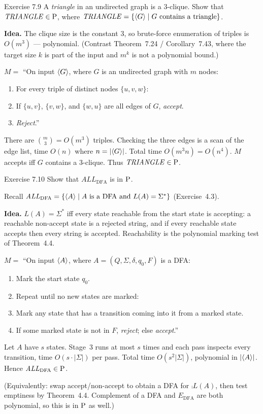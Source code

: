 \begin{question}{Exercise 7.9}
A \emph{triangle} in an undirected graph is a $3$-clique. Show that $\mathit{TRIANGLE}\in\mathrm{P}$, where $\mathit{TRIANGLE}=\{\langle G\rangle\mid \text{$G$ contains a triangle}\}$.
\end{question}
\begin{soln}
\textbf{Idea.} The clique size is the constant $3$, so brute-force enumeration of triples is $O(m^3)$ --- polynomial. (Contrast Theorem~7.24 / Corollary~7.43, where the target size $k$ is part of the input and $m^k$ is not a polynomial bound.)

$M=$ ``On input $\langle G\rangle$, where $G$ is an undirected graph with $m$ nodes:
\begin{enumerate}
\item For every triple of distinct nodes $\{u,v,w\}$:
\item \quad If $\{u,v\}$, $\{v,w\}$, and $\{w,u\}$ are all edges of $G$, \emph{accept}.
\item \emph{Reject}.''
\end{enumerate}

There are $\binom{m}{3}=O(m^3)$ triples. Checking the three edges is a scan of the edge list, time $O(n)$ where $n=|\langle G\rangle|$. Total time $O(m^3 n)=O(n^4)$. $M$ accepts iff $G$ contains a $3$-clique. Thus $\mathit{TRIANGLE}\in\mathrm{P}$.
\end{soln}

\begin{question}{Exercise 7.10}
Show that $\mathit{ALL}_{\mathrm{DFA}}$ is in $\mathrm{P}$.
\end{question}
\begin{soln}
Recall $\mathit{ALL}_{\mathrm{DFA}}=\{\langle A\rangle\mid \text{$A$ is a DFA and $L(A)=\Sigma^*$}\}$ (Exercise~4.3).

\textbf{Idea.} $L(A)=\Sigma^*$ iff every state reachable from the start state is accepting: a reachable non-accept state is a rejected string, and if every reachable state accepts then every string is accepted. Reachability is the polynomial marking test of Theorem~4.4.

$M=$ ``On input $\langle A\rangle$, where $A=(Q,\Sigma,\delta,q_0,F)$ is a DFA:
\begin{enumerate}
\item Mark the start state $q_0$.
\item Repeat until no new states are marked:
\item \quad Mark any state that has a transition coming into it from a marked state.
\item If some marked state is not in $F$, \emph{reject}; else \emph{accept}.''
\end{enumerate}

Let $A$ have $s$ states. Stage~3 runs at most $s$ times and each pass inspects every transition, time $O(s\cdot|\Sigma|)$ per pass. Total time $O(s^2|\Sigma|)$, polynomial in $|\langle A\rangle|$. Hence $\mathit{ALL}_{\mathrm{DFA}}\in\mathrm{P}$.

(Equivalently: swap accept/non-accept to obtain a DFA for $\comp{L(A)}$, then test emptiness by Theorem~4.4. Complement of a DFA and $E_{\mathrm{DFA}}$ are both polynomial, so this is in $\mathrm{P}$ as well.)
\end{soln}

